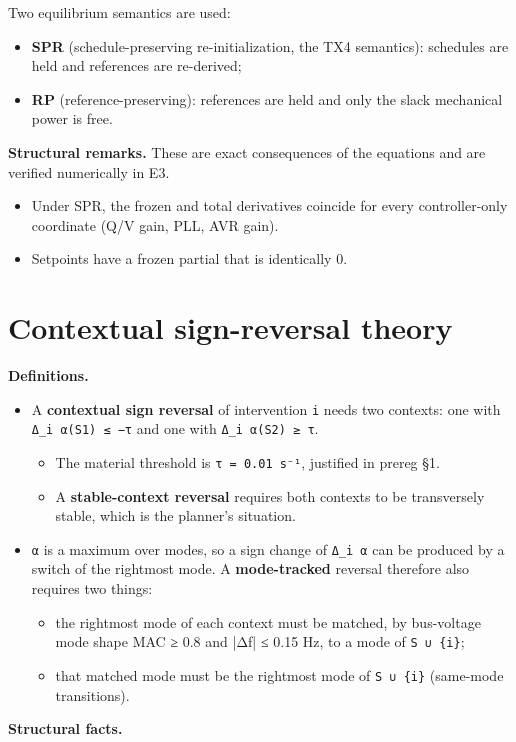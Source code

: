 \documentclass[10pt,a4paper]{article}
\begin{document}
Two equilibrium semantics are used:

\begin{itemize}
\item \textbf{SPR} (schedule-preserving re-initialization, the TX4 semantics): schedules are held and references are re-derived;
\item \textbf{RP} (reference-preserving): references are held and only the slack mechanical power is free.
\end{itemize}
\textbf{Structural remarks.} These are exact consequences of the equations and are verified numerically in E3.

\begin{itemize}
\item Under SPR, the frozen and total derivatives coincide for every controller-only coordinate (Q/V gain, PLL, AVR gain).
\item Setpoints have a frozen partial that is identically 0.
\end{itemize}
\section{Contextual sign-reversal theory}
\textbf{Definitions.}

\begin{itemize}
\item A \textbf{contextual sign reversal} of intervention \texttt{i} needs two contexts: one with \texttt{Δ\_\allowbreak{}i α(S1) ≤ −τ} and one with \texttt{Δ\_\allowbreak{}i α(S2) ≥ τ}.
\begin{itemize}
\item The material threshold is \texttt{τ =\allowbreak{} 0.01 s⁻¹}, justified in prereg §1.
\item A \textbf{stable-context reversal} requires both contexts to be transversely stable, which is the planner's situation.
\end{itemize}
\item \texttt{α} is a maximum over modes, so a sign change of \texttt{Δ\_\allowbreak{}i α} can be produced by a switch of the rightmost mode. A \textbf{mode-tracked} reversal therefore also requires two things:
\begin{itemize}
\item the rightmost mode of each context must be matched, by bus-voltage mode shape MAC ≥ 0.8 and |Δf| ≤ 0.15 Hz, to a mode of \texttt{S ∪ \{i\}};
\item that matched mode must be the rightmost mode of \texttt{S ∪ \{i\}} (same-mode transitions).
\end{itemize}
\end{itemize}
\textbf{Structural facts.}
\end{document}
